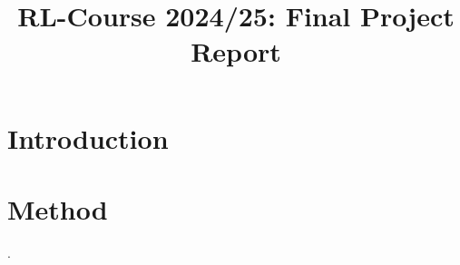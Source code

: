 \documentclass[11pt]{article}
\title{RL-Course 2024/25: Final Project Report}
\author{\theteam}
\begin{document}
\maketitle

\section{Introduction}\label{sec:intro}
\lipsum

\section{Method}\label{sec:Method}
\cite{wang2016:DDQN}.
\lipsum



\end{document}

